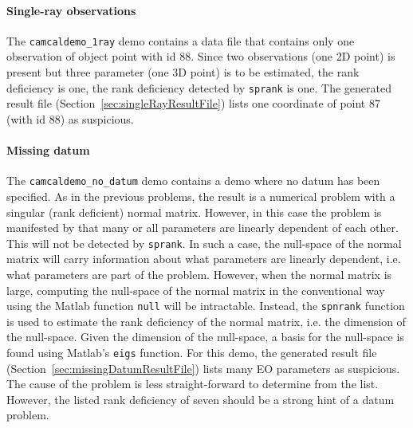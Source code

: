 \documentclass{article}
\begin{document}
\paragraph{Single-ray observations}
\label{sec:orgd14c57d}

The \texttt{camcaldemo\_1ray} demo contains a data file that contains
only one observation of object point with id 88. Since two
observations (one 2D point) is present but three parameter (one 3D
point) is to be estimated, the rank deficiency is one, the rank
deficiency detected by \texttt{sprank} is one. The generated result
file (Section~\ref{sec:singleRayResultFile}) lists one coordinate of
point 87 (with id 88) as suspicious.

\paragraph{Missing datum}
\label{sec:orgf77805f}

The \texttt{camcaldemo\_no\_datum} demo contains a demo where no datum
has been specified. As in the previous problems, the result is a
numerical problem with a singular (rank deficient) normal matrix.
However, in this case the problem is manifested by that many or all
parameters are linearly dependent of each other. This will not be
detected by \texttt{sprank}. In such a case, the null-space of the
normal matrix will carry information about what parameters are
linearly dependent, i.e. what parameters are part of the problem.
However, when the normal matrix is large, computing the null-space of
the normal matrix in the conventional way using the Matlab function
\texttt{null} will be intractable. Instead, the \texttt{spnrank}
\citep{Foster2009:Calculating} function is used to estimate the rank
deficiency of the normal matrix, i.e. the dimension of the null-space.
Given the dimension of the null-space, a basis for the null-space is
found using Matlab's \texttt{eigs} function. For this demo, the
generated result file (Section~\ref{sec:missingDatumResultFile}) lists
many EO parameters as suspicious. The cause of the problem is less
straight-forward to determine from the list. However, the listed rank
deficiency of seven should be a strong hint of a datum problem.
\end{document}
